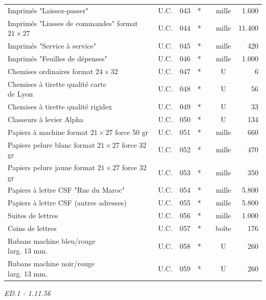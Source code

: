 {{\begin{tabular}{|l|c|r|c|c|c|r|}
Imprimés "Laissez-passer" & U.C. & 043 & * &  & mille & 1.600 \\
\shortstack[l]{Imprimés "Liasses de commandes"\\format $21\times27$} & U.C. & 044 & * &  & mille & 11.400 \\
Imprimés "Service à service" & U.C. & 045 & * &  & mille & 420 \\
Imprimés "Feuilles de dépenses" & U.C. & 046 & * &  & mille & 1.000 \\
Chemises ordinaires format $24\times32$ & U.C. & 047 & * &  & U & 6 \\
\shortstack[l]{Chemises à tirette qualité carte\\de Lyon} & U.C. & 048 & * &  & U & 56 \\
Chemises à tirette qualité rigidex & U.C. & 049 & * &  & U & 33 \\
Classeurs à levier Alpha & U.C. & 050 & * &  & U & 134 \\
\shortstack[l]{Papiers à machine format $21\times27$\\force 50 gr} & U.C. & 051 & * &  & mille & 660 \\
\shortstack[l]{Papiers pelure blanc format $21\times27$\\force 32 gr} & U.C. & 052 & * &  & mille & 470 \\
\shortstack[l]{Papiers pelure jaune format $21\times27$\\force 32 gr} & U.C. & 053 & * &  & mille & 350 \\
Papiers à lettre CSF "Rue du Maroc" & U.C. & 054 & * &  & mille & 5.800 \\
Papiers à lettre CSF (autres adresses) & U.C. & 055 & * &  & mille & 5.800 \\
Suites de lettres & U.C. & 056 & * &  & mille & 1.000 \\
Coins de lettres & U.C. & 057 & * &  & boîte & 176 \\
\shortstack[l]{Rubans machine bleu/rouge\\larg. 13 mm.} & U.C. & 058 & * &  & U & 260 \\
\shortstack[l]{Rubans machine noir/rouge\\larg. 13 mm.} & U.C. & 059 & * &  & U & 260 \\
\end{tabular}}}
\hfill\textit{ED.1 - 1.11.56}
